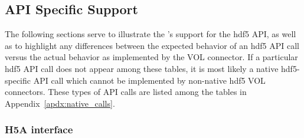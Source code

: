\documentclass[../users_guide.tex]{subfiles}
\begin{document}
\newpage

\subsection{API Specific Support}

The following sections serve to illustrate the \rvc{}'s support for the \acrshort{hdf5} API, as well as to highlight any differences between the expected behavior of an \acrshort{hdf5} API call versus the actual behavior as implemented by the VOL connector. If a particular \acrshort{hdf5} API call does not appear among these tables, it is most likely a native \acrshort{hdf5}-specific API call which cannot be implemented by non-native \acrshort{hdf5} VOL connectors. These types of API calls are listed among the tables in Appendix~\ref{apdx:native_calls}.

\newpage

\subsubsection{H5A interface}
\end{document}
